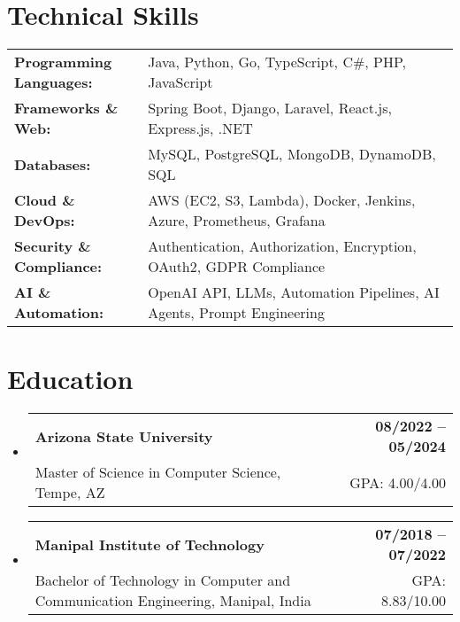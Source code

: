 \documentclass[letterpaper,11pt]{article}
\makeatletter
\newcommand{\educationSubheading}[4]{
  \vspace{-2pt}\item
    \begin{tabular*}{1.0\textwidth}[t]{l@{\extracolsep{\fill}}r}
      \textbf{\small #1} & \textbf{\small #2} \\
      {\small#3} & {\small #4} \\
    \end{tabular*}\vspace{-7pt}
}
\newcommand{\resumeSubHeadingListStart}{\begin{itemize}[leftmargin=0pt, label={}]}
\newcommand{\resumeSubHeadingListEnd}{\end{itemize}}
\makeatother
\begin{document}
\section{Technical Skills}
        \vspace{-14pt}
        \begin{table}[h]
            \footnotesize
            \begin{tabular}{p{0.3\linewidth} p{0.7\linewidth}}
                \textbf{Programming Languages:} & Java, Python, Go, TypeScript, C\#, PHP, JavaScript \\
                \textbf{Frameworks \& Web:} & Spring Boot, Django, Laravel, React.js, Express.js, .NET \\
                \textbf{Databases:} & MySQL, PostgreSQL, MongoDB, DynamoDB, SQL \\
                \textbf{Cloud \& DevOps:} & AWS (EC2, S3, Lambda), Docker, Jenkins, Azure, Prometheus, Grafana \\
                \textbf{Security \& Compliance:} & Authentication, Authorization, Encryption, OAuth2, GDPR Compliance \\
                \textbf{AI \& Automation:} & OpenAI API, LLMs, Automation Pipelines, AI Agents, Prompt Engineering \\
            \end{tabular}
        \end{table}

 \vspace{-15pt}

\section{Education}
  \resumeSubHeadingListStart
    \educationSubheading
      {Arizona State University}{08/2022 -- 05/2024}
      {Master of Science in Computer Science, Tempe, AZ}{GPA: 4.00/4.00}

    \educationSubheading
      {Manipal Institute of Technology}{07/2018 -- 07/2022}
      {Bachelor of Technology in Computer and Communication Engineering, Manipal, India}{GPA: 8.83/10.00}
  \resumeSubHeadingListEnd
\end{document}
